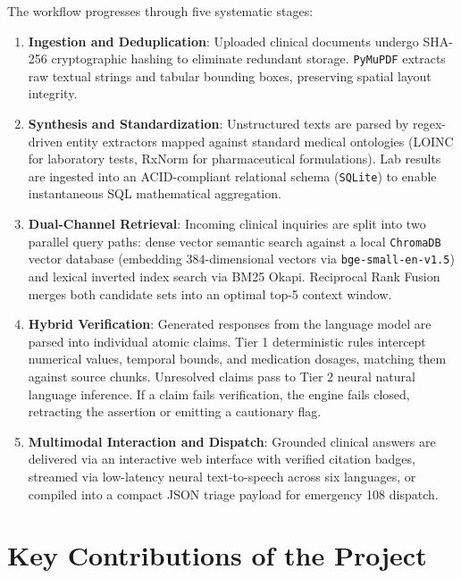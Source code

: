 The workflow progresses through five systematic stages:
\begin{enumerate}
    \item \textbf{Ingestion and Deduplication}: Uploaded clinical documents undergo SHA-256 cryptographic hashing to eliminate redundant storage. \texttt{PyMuPDF} extracts raw textual strings and tabular bounding boxes, preserving spatial layout integrity.
    \item \textbf{Synthesis and Standardization}: Unstructured texts are parsed by regex-driven entity extractors mapped against standard medical ontologies (LOINC for laboratory tests, RxNorm for pharmaceutical formulations). Lab results are ingested into an ACID-compliant relational schema (\texttt{SQLite}) to enable instantaneous SQL mathematical aggregation.
    \item \textbf{Dual-Channel Retrieval}: Incoming clinical inquiries are split into two parallel query paths: dense vector semantic search against a local \texttt{ChromaDB} vector database (embedding $384$-dimensional vectors via \texttt{bge-small-en-v1.5}) and lexical inverted index search via BM25 Okapi. Reciprocal Rank Fusion merges both candidate sets into an optimal top-5 context window.
    \item \textbf{Hybrid Verification}: Generated responses from the language model are parsed into individual atomic claims. Tier 1 deterministic rules intercept numerical values, temporal bounds, and medication dosages, matching them against source chunks. Unresolved claims pass to Tier 2 neural natural language inference. If a claim fails verification, the engine fails closed, retracting the assertion or emitting a cautionary flag.
    \item \textbf{Multimodal Interaction and Dispatch}: Grounded clinical answers are delivered via an interactive web interface with verified citation badges, streamed via low-latency neural text-to-speech across six languages, or compiled into a compact JSON triage payload for emergency 108 dispatch.
\end{enumerate}


\section{Key Contributions of the Project}
\label{sec:intro_contributions}

